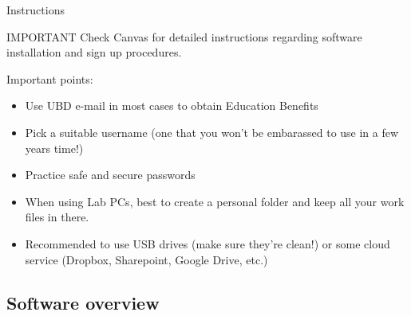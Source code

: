 \documentclass[,aspectratio=169]{beamer}
\begin{document}
\begin{frame}{Instructions}
\begin{alertblock}{IMPORTANT}
Check Canvas for detailed instructions regarding software installation
and sign up procedures.

\end{alertblock}

Important points:

\begin{itemize}
\item
  Use UBD e-mail in most cases to obtain Education Benefits
\item
  Pick a suitable username (one that you won't be embarassed to use in a
  few years time!)
\item
  Practice safe and secure passwords
\item
  When using Lab PCs, best to create a personal folder and keep all your
  work files in there.
\item
  Recommended to use USB drives (make sure they're clean!) or some cloud
  service (Dropbox, Sharepoint, Google Drive, etc.)
\end{itemize}
\end{frame}

\hypertarget{software-overview}{%
\subsection{Software overview}\label{software-overview}}
\end{document}
